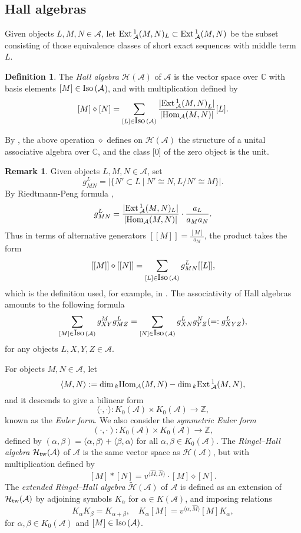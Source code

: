 \documentclass[reqno,12pt]{amsart}
\numberwithin{equation}{section}
\def\Ext{\mbox{\rm Ext}\,} \def\Hom{\mbox{\rm Hom}} \def\dim{\mbox{\rm dim}\,} \def\Iso{\mbox{\rm Iso}\,}
\def\lr#1{\langle #1\rangle} \def\fin{\hfill$\square$}  \def\lra{\longrightarrow} \def\Tor{\mbox{\rm Tor}\,}
\def\A{{\mathcal A}}\def\P{{\mathscr{P}}}
\theoremstyle{plain} %
\theoremstyle{definition} %
\newtheorem{definition}[theorem]{\bf Definition}
\newtheorem{remark}[theorem]{\bf Remark}
\begin{document}
\subsection{Hall algebras}
 Given objects $L,M,N \in \mathcal{A}$, let $\Ext_\mathcal{A}^1(M,N)_L \subset \Ext_\mathcal{A}^1(M,N)$ be the subset consisting of those equivalence classes of short exact sequences with middle term $L$.
\begin{definition}\label{Hall algebra of abelian category}
The \emph{Hall algebra} $\mathcal {H}(\mathcal{A})$ of $\mathcal{A}$ is the vector space over $\mathbb{C}$ with basis elements $[M] \in \Iso(\mathcal{A}$), and with multiplication defined by
\[[M] \diamond [N] = \sum\limits_{[L] \in \Iso(\mathcal{A})} {\frac{{|\Ext_\mathcal{A}^1{{(M,N)}_L}|}}{{|\Hom_\mathcal{A}(M,N)|}}} [L].\]
\end{definition}
By \cite{R90a}, the above operation $\diamond$ defines on $\mathcal {H}(\mathcal{A})$ the structure of a unital associative algebra over $\mathbb{C}$, and the class [0] of the zero object is the unit.
\begin{remark}
Given objects $L,M,N\in \A$, set
$$g_{MN}^L=|\{N'\subset L~|~N'\cong N, L/N'\cong M\}|.$$
By Riedtmann-Peng formula \cite{Riedtmann,Peng},
$$g_{MN}^{L}=\frac{|\Ext^1_{\A}(M,N)_{L}|}{|\Hom_{\A}(M,N)|}\cdot \frac{a_{L}}{a_{M}a_{N}}.$$ Thus in terms of alternative generators $[[M]]=\frac{[M]}{a_M}$, the product takes the form
$$[[M]]\diamond [[N]]= \sum\limits_{[L] \in \Iso(\mathcal{A})}g_{MN}^L[[L]],$$
which is the definition used, for example, in \cite{R90a,Sc}. The associativity of Hall algebras amounts to the following formula
\begin{equation}\label{jiehe}\sum\limits_{[M] \in \Iso(\mathcal{A})}g_{XY}^Mg_{MZ}^L=\sum\limits_{[N] \in \Iso(\mathcal{A})}g_{XN}^Lg_{YZ}^N(=:g_{XYZ}^L),\end{equation} for any objects $L,X,Y,Z\in\A$.
\end{remark}


For objects $M,N \in \mathcal{A}$, let $$\lr{M,N}:=\dim_k\Hom_{\A}(M,N)-\dim_k\Ext^1_{\A}(M,N),$$
and it descends to give a bilinear form
$$\lr{\cdot ,\cdot }: K_0(\mathcal{A})\times K_0(\mathcal{A})\longrightarrow \mathbb{Z},$$ known as the \emph{Euler form}. We also consider the \emph{symmetric Euler form}
$$(\cdot ,\cdot ): K_0(\mathcal{A})\times K_0(\mathcal{A})\longrightarrow \mathbb{Z},$$ defined by $(\alpha,\beta)=\lr{\alpha,\beta}+\lr{\beta,\alpha}$ for all $\alpha,\beta \in K_0(\mathcal{A})$.
The \emph{Ringel--Hall algebra} ${\mathcal {H}}_{\rm{tw}}(\mathcal{A})$ of $\mathcal{A}$ is the same vector space as $\mathcal {H}(\mathcal{A})$, but with multiplication defined by $$[M]\ast[N]=v^{\lr{\hat{M},\hat{N}}}\cdot[M]\diamond[N].$$
The \emph{extended Ringel--Hall algebra} $\tilde{\mathcal {H}}(\A)$ of $\A$ is defined as an extension of ${\mathcal {H}}_{\rm{tw}}(\mathcal{A})$ by adjoining symbols $K_{\alpha}$ for $\alpha\in K(\A)$, and imposing relations $$K_{\alpha}K_{\beta}=K_{\alpha+\beta},\quad K_{\alpha}[M]=v^{\lr{\alpha,\hat{M}}}[M]K_{\alpha},$$ for $\alpha,\beta\in K_0(\A)$ and $[M]\in \Iso(\mathcal{A})$.
\end{document}
